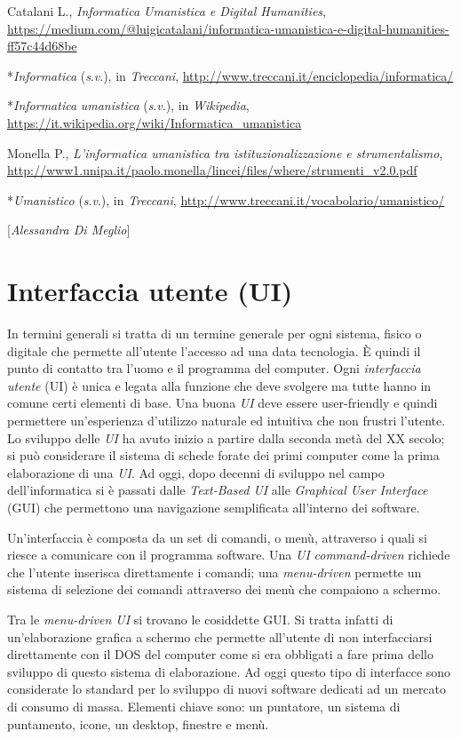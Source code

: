 {{{Catalani L., \emph{Informatica Umanistica e Digital Humanities},
\url{https://medium.com/@luigicatalani/informatica-umanistica-e-digital-humanities-ff57c44d68be}

*\emph{Informatica} (\emph{s}.\emph{v}.), in \emph{Treccani},
\url{http://www.treccani.it/enciclopedia/informatica/}

*\emph{Informatica} \emph{umanistica} (\emph{s}.\emph{v}.), in
\emph{Wikipedia},
\url{https://it.wikipedia.org/wiki/Informatica\_umanistica}

Monella P., \emph{L'informatica umanistica tra istituzionalizzazione e
strumentalismo},
\url{http://www1.unipa.it/paolo.monella/lincei/files/where/strumenti_v2.0.pdf}

*\emph{Umanistico} (\emph{s}.\emph{v}.), in \emph{Treccani},
\url{http://www.treccani.it/vocabolario/umanistico/}
}

\hrulefill 

{[}\emph{Alessandra Di Meglio}{]}

\chapter{Interfaccia utente (UI)}

In termini generali si tratta di un termine generale per ogni sistema,
fisico o digitale che permette all'utente l'accesso ad una data
tecnologia. È quindi il punto di contatto tra l'uomo e il programma del
computer. Ogni \emph{interfaccia utente} (UI) è unica e legata alla
funzione che deve svolgere ma tutte hanno in comune certi elementi di
base. Una buona \emph{UI} deve essere user-friendly e quindi permettere
un'esperienza d'utilizzo naturale ed intuitiva che non frustri l'utente.
Lo sviluppo delle \emph{UI} ha avuto inizio a partire dalla seconda metà
del XX secolo; si può considerare il sistema di schede forate dei primi
computer come la prima elaborazione di una \emph{UI}. Ad oggi, dopo
decenni di sviluppo nel campo dell'informatica si è passati dalle
\emph{Text-Based UI} alle \emph{Graphical User Interface} (GUI) che
permettono una navigazione semplificata all'interno dei software.

Un'interfaccia è composta da un set di comandi, o menù, attraverso i
quali si riesce a comunicare con il programma software. Una \emph{UI}
\emph{command-driven} richiede che l'utente inserisca direttamente i
comandi; una \emph{menu-driven} permette un sistema di selezione dei
comandi attraverso dei menù che compaiono a schermo.

Tra le \emph{menu-driven UI} si trovano le cosiddette GUI. Si tratta
infatti di un'elaborazione grafica a schermo che permette all'utente di
non interfacciarsi direttamente con il DOS del computer come si era
obbligati a fare prima dello sviluppo di questo sistema di elaborazione.
Ad oggi questo tipo di interfacce sono considerate lo standard per lo
sviluppo di nuovi software dedicati ad un mercato di consumo di massa.
Elementi chiave sono: un puntatore, un sistema di puntamento, icone, un
desktop, finestre e menù.

}}
